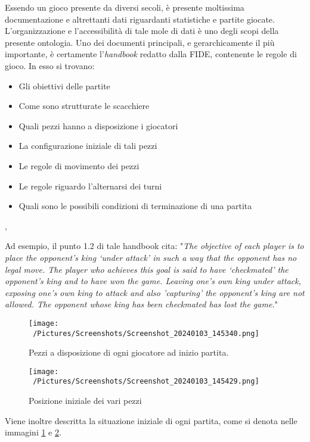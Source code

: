 \documentclass[12pt]{book}
\begin{document}
Essendo un gioco presente da diversi secoli, è presente moltissima
documentazione e altrettanti dati riguardanti statistiche e partite
giocate. L'organizzazione e l'accessibilità di tale mole di dati è uno degli scopi della
presente ontologia. Uno dei documenti principali, e gerarchicamente il
più importante, è certamente l'\textit{handbook} redatto dalla FIDE,
contenente le regole di gioco. In esso si trovano:
\begin{itemize}

  \item Gli obiettivi delle partite
  \item Come sono strutturate le scacchiere
  \item Quali pezzi hanno a disposizione i giocatori
  \item La configurazione iniziale di tali pezzi
  \item Le regole di movimento dei pezzi
  \item Le regole riguardo l'alternarsi dei turni
  \item Quali sono le possibili condizioni di terminazione di una
    partita

\end{itemize}, 


Ad esempio, il punto 1.2 di tale handbook cita: "\textit{The objective of each player is to place the opponent’s king ‘under attack’ in such a way
that the opponent has no legal move. The player who achieves this goal is said to have
‘checkmated’ the opponent’s king and to have won the game. Leaving one’s own king
under attack, exposing one’s own king to attack and also ’capturing’ the opponent’s king
are not allowed. The opponent whose king has been checkmated has lost
the game.}"

\begin{figure}[h]
  \caption{Pezzi a disposizione di ogni giocatore ad inizio partita.}
  \centering
  \label{fig:pezzi_inizio}
  \texttt{[image: ~/Pictures/Screenshots/Screenshot\_20240103\_145340.png]}
\end{figure} 

\begin{figure}[h]
  \caption{Posizione iniziale dei vari pezzi}
  \centering
  \label{fig:inizio_scacchiera}
  \texttt{[image: ~/Pictures/Screenshots/Screenshot\_20240103\_145429.png]}
\end{figure} 

Viene inoltre descritta la situazione iniziale di ogni partita, come
si denota nelle immagini \ref{fig:pezzi_inizio} e \ref{fig:inizio_scacchiera}.
\end{document}
